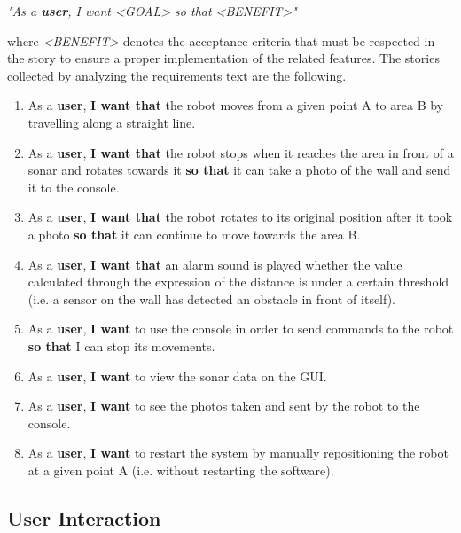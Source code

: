 \documentclass[a4paper]{article}
\begin{document}
\begin{center}
\textit{"As a \textbf{user}, I want <GOAL> so that <BENEFIT>"}
\end{center}

where \textit{<BENEFIT>} denotes the acceptance criteria that must be respected in the story to ensure a proper implementation of the related features. \newline\newline
The stories collected by analyzing the requirements text are the following.

\begin{enumerate}
	\item As a \textbf{user}, \textbf{I want that} the robot moves from a given point A to area B by travelling along a straight line.
	\item As a \textbf{user}, \textbf{I want that} the robot stops when it reaches the area in front of a sonar and rotates towards it \textbf{so that} it can take a photo of the wall and send it to the console.
	\item As a \textbf{user}, \textbf{I want that} the robot rotates to its original position after it took a photo \textbf{so that} it can continue to move towards the area B.
	\item As a \textbf{user}, \textbf{I want that} an alarm sound is played whether the value calculated through the expression of the distance is under a certain threshold (i.e. a sensor on the wall has detected an obstacle in front of itself).
	\item As a \textbf{user}, \textbf{I want} to use the console in order to send commands to the robot \textbf{so that} I can stop its movements.
	\item As a \textbf{user}, \textbf{I want} to view the sonar data on the GUI.
	\item As a \textbf{user}, \textbf{I want} to see the photos taken and sent by the robot to the console.
	\item As a \textbf{user}, \textbf{I want} to restart the system by manually repositioning the robot at a given point A (i.e. without restarting the software).
\end{enumerate}


\subsection {User Interaction}
\end{document}
